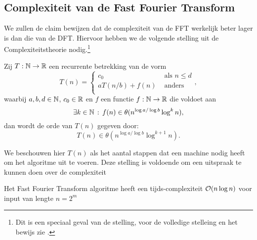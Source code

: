 \subsection{Complexiteit van de Fast Fourier Transform}
We zullen de claim bewijzen dat de complexiteit van de FFT werkelijk beter lager is dan die van de DFT.
Hiervoor hebben we de volgende stelling uit de Complexiteitstheorie nodig.\footnote{Dit is een speciaal geval van de stelling, voor de volledige stelleing en het bewijs zie \cite{akra-bazzi}.}

\begin{stelling}
    Zij $T:\mathbb{N}\to\mathbb{R}$ een recurrente betrekking van de vorm
    \[
    T(n) = \begin{cases}
      c_0 &\text{ als } n \leq d \\
      a T(n/b) + f(n) &\text{ anders} \\
    \end{cases},
    \]
    waarbij $a,b,d\in\mathbb{N}$, $c_0\in\mathbb{R}$ en $f$ een functie $f:\mathbb{N}\rightarrow\mathbb{R}$ die voldoet aan 
    \[
    \exists k \in \mathbb{N} \,:\, f(n) \in \theta(n^{\log a/\log b} \log^k n),
    \]
    dan wordt de orde van $T(n)$ gegeven door:
    \[
      T(n) \in \theta(n^{\log a / \log b} \log^{k+1}n).
    \]
\end{stelling}
We beschouwen hier $T(n)$ als het aantal stappen dat een machine nodig heeft om het algoritme uit te voeren.
Deze stelling is voldoende om een uitspraak te kunnen doen over de complexiteit 
\begin{stelling}
  Het Fast Fourier Transform algoritme heeft een tijds-complexiteit $\mathcal{O}(n\log n)$ voor input van lengte $n=2^m$ 
\end{stelling} 
